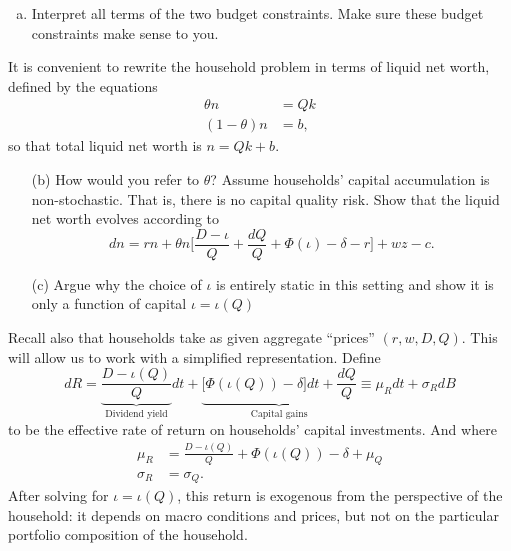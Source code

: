 \documentclass[11pt]{extarticle}
\theoremstyle{plain}
\theoremstyle{definition}
\begin{document}
\begin{enumerate}[(a)]
\item Interpret all terms of the two budget constraints. Make sure these budget constraints make sense to you.
\end{enumerate}


\vspace{5mm}
\noindent
It is convenient to rewrite the household problem in terms of liquid net worth, defined by the equations 
\begin{align*}
	\theta n &= Q k \\
	(1-\theta) n &= b,
\end{align*}
so that total liquid net worth is $n = Qk + b$.


\begin{enumerate}
\item [(b)] How would you refer to $\theta$? Assume households' capital accumulation is non-stochastic. That is, there is no capital quality risk. Show that the liquid net worth evolves according to 
\begin{equation*}
	dn = rn +  \theta n \bigg[ \frac{D - \iota }{Q} +  \frac{dQ}{Q} + \Phi(\iota) - \delta - r \bigg]  + w z - c .
\end{equation*}
 
\item [(c)] Argue why the choice of $\iota$ is entirely static in this setting and show it is only a function of capital $\iota = \iota(Q)$ 
\end{enumerate}


\vspace{5mm}
\noindent
Recall also that households take as given aggregate ``prices'' $(r, w, D, Q)$.  This will allow us to work with a simplified representation. Define 
\begin{equation*}
	dR = \underbrace{\frac{D - \iota (Q) }{Q}}_\text{Dividend yield} dt + \underbrace{\Big[\Phi(\iota(Q)) - \delta \Big] dt +  \frac{dQ}{Q}}_\text{Capital gains} \equiv \mu_R dt + \sigma_R dB
\end{equation*}
to be the effective rate of return on households' capital investments. And where
\begin{align*}
	\mu_R &= \frac{D - \iota (Q) }{Q}  + \Phi(\iota(Q)) - \delta + \mu_Q \\
	\sigma_R &= \sigma_Q. 
\end{align*}
After solving for $\iota = \iota(Q)$, this return is exogenous from the perspective of the household: it depends on macro conditions and prices, but not on the particular portfolio composition of the household.
\end{document}
